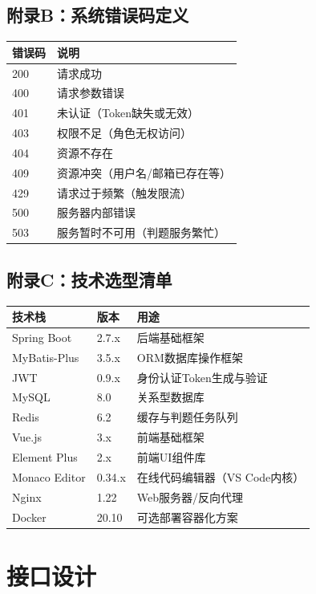 \documentclass{../template/softeng}
\begin{document}
\subsection{附录B：系统错误码定义}
\begin{longtable}{|p{3cm}|p{10cm}|}
	\hline
	\textbf{错误码} & \textbf{说明} \\
	\hline
	200 & 请求成功 \\
	\hline
	400 & 请求参数错误 \\
	\hline
	401 & 未认证（Token缺失或无效） \\
	\hline
	403 & 权限不足（角色无权访问） \\
	\hline
	404 & 资源不存在 \\
	\hline
	409 & 资源冲突（用户名/邮箱已存在等） \\
	\hline
	429 & 请求过于频繁（触发限流） \\
	\hline
	500 & 服务器内部错误 \\
	\hline
	503 & 服务暂时不可用（判题服务繁忙） \\
	\hline
\end{longtable}

\subsection{附录C：技术选型清单}
\begin{longtable}{|p{3cm}|p{3cm}|p{8cm}|}
	\hline
	\textbf{技术栈} & \textbf{版本} & \textbf{用途} \\
	\hline
	Spring Boot & 2.7.x & 后端基础框架 \\
	\hline
	MyBatis-Plus & 3.5.x & ORM数据库操作框架 \\
	\hline
	JWT & 0.9.x & 身份认证Token生成与验证 \\
	\hline
	MySQL & 8.0 & 关系型数据库 \\
	\hline
	Redis & 6.2 & 缓存与判题任务队列 \\
	\hline
	Vue.js & 3.x & 前端基础框架 \\
	\hline
	Element Plus & 2.x & 前端UI组件库 \\
	\hline
	Monaco Editor & 0.34.x & 在线代码编辑器（VS Code内核） \\
	\hline
	Nginx & 1.22 & Web服务器/反向代理 \\
	\hline
	Docker & 20.10 & 可选部署容器化方案 \\
	\hline
\end{longtable}
	\section{接口设计}
	
\end{document}
